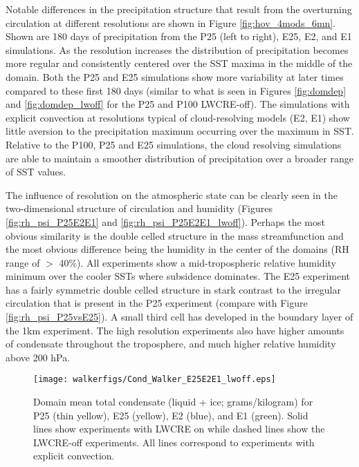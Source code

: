 \documentclass[draft]{agujournal2019}
\begin{document}
{Notable differences in the precipitation structure that result from the overturning circulation at different resolutions are shown in Figure \ref{fig:hov_4mods_6mn}.  
Shown are 180 days of precipitation from the P25 (left to right), E25, E2, and E1 simulations.  
As the resolution increases the distribution of precipitation becomes more regular and consistently centered over the SST maxima in the middle of 
the domain.  Both the P25 and E25 simulations show more variability at later times compared to these 
first 180 days (similar to what is seen in Figures \ref{fig:domdep}  and \ref{fig:domdep_lwoff} for the P25 and P100 LWCRE-off).  
The simulations with explicit convection at resolutions typical of cloud-resolving models 
(E2, E1) show little aversion to the precipitation maximum occurring over the maximum in SST.
Relative to the P100, P25 and E25 simulations, the cloud resolving simulations are able to maintain a smoother distribution of 
precipitation over a broader range of SST values.    

The influence of resolution on the atmospheric state can be clearly seen in the two-dimensional structure 
of circulation and humidity (Figures \ref{fig:rh_psi_P25E2E1} and \ref{fig:rh_psi_P25E2E1_lwoff}).
Perhaps the most obvious similarity is the double celled structure in the mass streamfunction and the most 
obvious difference being the humidity in the center of the domains (RH range of $>$ 40\%). %
All experiments show a mid-tropospheric relative humidity minimum over the cooler SSTs where subsidence 
dominates.  The E25 experiment has a fairly symmetric double celled structure in stark contrast to the irregular circulation 
that is present in the P25 experiment (compare with Figure \ref{fig:rh_psi_P25vsE25}). 
A small third cell has developed in the boundary layer of the 1km experiment.   The high resolution experiments also have 
higher amounts of condensate throughout the troposphere, and much higher relative humidity 
above 200 hPa. 


\begin{figure}
  \centering
       \texttt{[image: walkerfigs/Cond\_Walker\_E25E2E1\_lwoff.eps]}
          \caption{Domain mean total condensate (liquid + ice; grams/kilogram) for P25 (thin yellow), E25 (yellow), 
          E2 (blue), and E1 (green).  Solid lines show experiments with LWCRE on
          while dashed lines show the LWCRE-off experiments.  All lines correspond to experiments with explicit 
          convection.}
  \label{fig:TotCond}
\end{figure}
 
}
\end{document}

